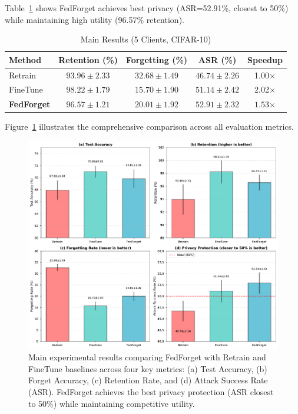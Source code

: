 \documentclass[10pt,twocolumn]{article}
\begin{document}
Table~\ref{tab:main_results} shows FedForget achieves best privacy (ASR=52.91\%, closest to 50\%) while maintaining high utility (96.57\% retention).

\begin{table}[t]
\centering
\caption{Main Results (5 Clients, CIFAR-10)}
\label{tab:main_results}
\begin{tabular}{lcccc}
\toprule
Method & Retention (\%) & Forgetting (\%) & ASR (\%) & Speedup \\
\midrule
Retrain & $93.96 \pm 2.33$ & $\mathbf{32.68 \pm 1.49}$ & $46.74 \pm 2.26$ & 1.00× \\
FineTune & $\mathbf{98.22 \pm 1.79}$ & $15.70 \pm 1.90$ & $51.14 \pm 2.42$ & 2.02× \\
\textbf{FedForget} & $\mathbf{96.57 \pm 1.21}$ & $20.01 \pm 1.92$ & $\mathbf{52.91 \pm 2.32}$ & $\mathbf{1.53}$× \\
\bottomrule
\end{tabular}
\end{table}

Figure~\ref{fig:main_results} illustrates the comprehensive comparison across all evaluation metrics.

\begin{figure}[htbp]
\centering
\includegraphics[width=\columnwidth]{figures/figure1_main_results.pdf}
\caption{Main experimental results comparing FedForget with Retrain and FineTune baselines across four key metrics: (a) Test Accuracy, (b) Forget Accuracy, (c) Retention Rate, and (d) Attack Success Rate (ASR). FedForget achieves the best privacy protection (ASR closest to 50\%) while maintaining competitive utility.}
\label{fig:main_results}
\end{figure}
\end{document}
